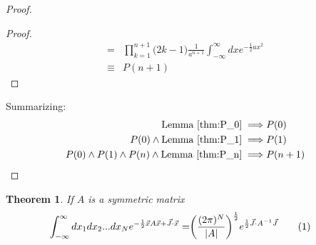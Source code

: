 \documentclass[]{article}
\newcommand\numberthis{\addtocounter{equation}{1}\tag{\theequation}}
\newtheorem{thm}{Theorem}
\begin{document}
\begin{proof}
\begin{proof}
\begin{align*}
		=&\prod_{k=1}^{n+1}\big(2k-1\big) \frac{1}{a^{n+1}}\int_{-\infty}^{\infty} dx e^{-\frac{1}{2}ax^2}\\
		\equiv& P(n+1)
		\end{align*}
	\end{proof}
	Summarizing:
	\begin{align*}
		\text{Lemma }\ref{thm:P_0} \implies& P(0)\\
		P(0) \land \text{Lemma } \ref{thm:P_1} \implies& P(1)\\
		P(0) \land P(1)\land P(n) \land \text{Lemma } \ref{thm:P_n} \implies& P(n+1)
	\end{align*}
\end{proof}

\begin{thm}
	If $A$ is a symmetric matrix
	\begin{align*}
		\int_{-\infty}^{\infty}dx_1 dx_2...dx_N e^{-\frac{1}{2}\vec{x}A\vec{x} + \vec{J} \cdot \vec{x}} =& \bigg(\frac{(2\pi)^N}{\vert A \vert}\bigg)^\frac{1}{2} e^{\frac{1}{2}\vec{J}\cdot A^{-1} \vec{J}} \numberthis \label {eq:Zee_I_2_22}
	\end{align*}
\end{thm}
\end{document}
